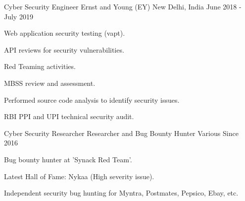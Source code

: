 \begin{cventries}
  \cventry
    {Cyber Security Engineer} %
    {Ernst and Young (EY)} %
    {New Delhi, India} %
    {June 2018 - July 2019} %
    {
      \begin{cvitems} %
        \item {Web application security testing (vapt).}
        \item {API reviews for security vulnerabilities.}
        \item {Red Teaming activities.}
        \item {MBSS review and assessment.}
        \item {Performed source code analysis to identify security issues.}
        \item {RBI PPI and UPI technical security audit.}
      \end{cvitems}
    }

  \cventry
    {Cyber Security Researcher} %
    {Researcher and Bug Bounty Hunter} %
    {Various} %
    {Since 2016} %
    {
      \begin{cvitems} %
        \item {Bug bounty hunter at 'Synack Red Team'.}
        \item {Latest Hall of Fame: Nykaa (High severity issue).}
        \item {Independent security bug hunting for Myntra, Postmates, Pepsico, Ebay, etc.}
      \end{cvitems}
    }

\end{cventries}
